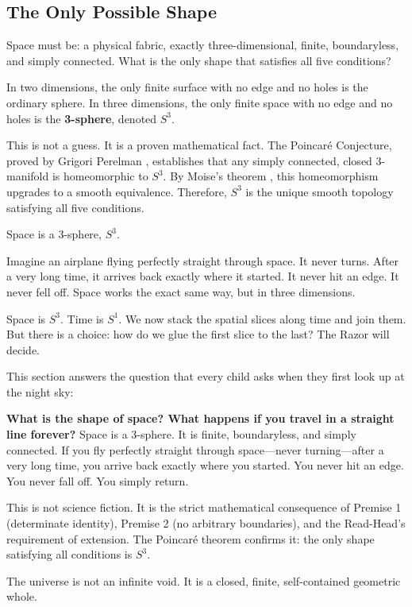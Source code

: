 \documentclass[11pt]{article}
\theoremstyle{canonstyle}
\providecommand{\Sone}{S^1}
\providecommand{\Sthree}{S^3}
\begin{document}
\subsection{The Only Possible Shape}

\begin{reflect}
Space must be: a physical fabric, exactly three-dimensional, finite, boundaryless, and simply connected. What is the only shape that satisfies all five conditions?
\end{reflect}

In two dimensions, the only finite surface with no edge and no holes is the ordinary sphere. In three dimensions, the only finite space with no edge and no holes is the \textbf{3-sphere}, denoted $\Sthree$. 

This is not a guess. It is a proven mathematical fact. The Poincaré Conjecture, proved by Grigori Perelman \cite{Perelman}, establishes that any simply connected, closed 3-manifold is homeomorphic to $\Sthree$. By Moise's theorem \cite{Moise}, this homeomorphism upgrades to a smooth equivalence. Therefore, $\Sthree$ is the unique smooth topology satisfying all five conditions.

\begin{keyresult}
Space is a 3-sphere, $\Sthree$.
\end{keyresult}

Imagine an airplane flying perfectly straight through space. It never turns. After a very long time, it arrives back exactly where it started. It never hit an edge. It never fell off. Space works the exact same way, but in three dimensions.

Space is $\Sthree$. Time is $\Sone$. We now stack the spatial slices along time and join them. But there is a choice: how do we glue the first slice to the last? The Razor will decide.

\newpage

\begin{realization}
This section answers the question that every child asks when they first look up at the night sky:

\medskip

\textbf{What is the shape of space? What happens if you travel in a straight line forever?}
Space is a 3-sphere. It is finite, boundaryless, and simply connected. If you fly perfectly straight through space---never turning---after a very long time, you arrive back exactly where you started. You never hit an edge. You never fall off. You simply return.

This is not science fiction. It is the strict mathematical consequence of Premise 1 (determinate identity), Premise 2 (no arbitrary boundaries), and the Read-Head's requirement of extension. The Poincar\'e theorem confirms it: the only shape satisfying all conditions is $\Sthree$.

\medskip

The universe is not an infinite void. It is a closed, finite, self-contained geometric whole.
\end{realization}
\end{document}
